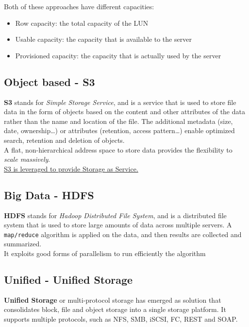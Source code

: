 Both of these approaches have different capacities:\ns
\begin{itemize}
   \item Row capacity: the total capacity of the LUN
   \item Usable capacity: the capacity that is available to the server
   \item Provisioned capacity: the capacity that is actually used by the server
\end{itemize}

\subsection{Object based - S3}
\textbf{S3} stands for \textit{Simple Storage Service}, and is a service that is used to store file data in the form of objects based on the content and other attributes of the data rather than the name and location of the file.
The additional metadata (size, date, ownership\dots) or attributes (retention, access pattern\dots) enable optimized search, retention and deletion of objects.\\
A flat, non-hierarchical address space to store data provides the flexibility to \textit{scale massively}.\\
\ul{S3 is leveraged to provide Storage as Service.}

\subsection{Big Data - HDFS}
\textbf{HDFS} stands for \textit{Hadoop Distributed File System}, and is a distributed file system that is used to store large amounts of data across multiple servers.
A \texttt{map/reduce} algorithm is applied on the data, and then results are collected and summarized.\\
It exploits good forms of parallelism to run efficiently the algorithm

\subsection{Unified - Unified Storage}
\textbf{Unified Storage} or multi-protocol storage has emerged as solution that consolidates block, file and object storage into a single storage platform. It supports multiple protocols, such as NFS, SMB, iSCSI, FC, REST and SOAP.

